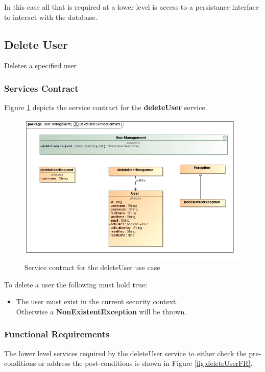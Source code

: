 In this case all that is required at a lower level is access to a persistance
interface to interact with the database.

\subsection{Delete User}
Deletes a specified user

\subsubsection{Services Contract}
Figure \ref{fig:DeleteUserSC} depicts the service
contract for the \textbf{deleteUser} service.

\begin{figure}[H]
	\begin{center}
		\includegraphics[scale=0.55]{../Diagrams and Charts/Users/DeleteUserServiceContract.jpg}
		\caption{Service contract for the deleteUser use case}
		\label{fig:DeleteUserSC}
	\end{center}
\end{figure}

To delete a user the following must hold true:
\begin{itemize}
	\item The user must exist in the current security context.\\
	Otherwise a \textbf{NonExistentException} will be thrown.
\end{itemize}

\subsubsection{Functional Requirements}
The lower level services required by the deleteUser service
to either check the pre-conditions or address the post-conditions is shown
in Figure \ref{fig:deleteUserFR}.

